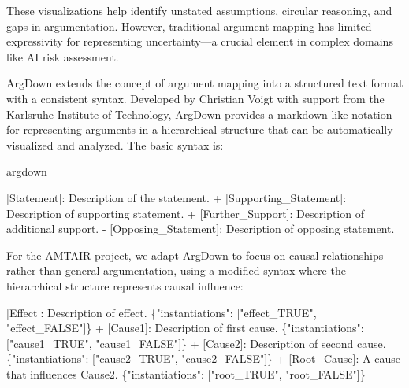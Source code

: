 \documentclass[
  11pt,
  letterpaper,
]{book}
\newenvironment{Shaded}{\begin{snugshade}}{\end{snugshade}}
\newcommand{\CommentTok}[1]{\textcolor[rgb]{0.37,0.37,0.37}{#1}}
\newcommand{\DataTypeTok}[1]{\textcolor[rgb]{0.68,0.00,0.00}{#1}}
\newcommand{\ErrorTok}[1]{\textcolor[rgb]{0.68,0.00,0.00}{#1}}
\newcommand{\FunctionTok}[1]{\textcolor[rgb]{0.28,0.35,0.67}{#1}}
\newcommand{\NormalTok}[1]{\textcolor[rgb]{0.00,0.23,0.31}{#1}}
\newcommand{\OtherTok}[1]{\textcolor[rgb]{0.00,0.23,0.31}{#1}}
\newcommand{\SpecialStringTok}[1]{\textcolor[rgb]{0.13,0.47,0.30}{#1}}
\newcommand{\StringTok}[1]{\textcolor[rgb]{0.13,0.47,0.30}{#1}}
\begin{document}
These visualizations help identify unstated assumptions, circular
reasoning, and gaps in argumentation. However, traditional argument
mapping has limited expressivity for representing uncertainty---a
crucial element in complex domains like AI risk assessment.

ArgDown extends the concept of argument mapping into a structured text
format with a consistent syntax. Developed by Christian Voigt with
support from the Karlsruhe Institute of Technology, ArgDown provides a
markdown-like notation for representing arguments in a hierarchical
structure that can be automatically visualized and analyzed. The basic
syntax is:

argdown

\begin{Shaded}
\begin{Highlighting}[]
\OtherTok{[Statement]: }\NormalTok{Description of the statement.}
\SpecialStringTok{ + }\CommentTok{[}\OtherTok{Supporting\_Statement}\CommentTok{]}\NormalTok{: Description of supporting statement.}
\SpecialStringTok{   + }\CommentTok{[}\OtherTok{Further\_Support}\CommentTok{]}\NormalTok{: Description of additional support.}
\SpecialStringTok{ {-} }\CommentTok{[}\OtherTok{Opposing\_Statement}\CommentTok{]}\NormalTok{: Description of opposing statement.}
\end{Highlighting}
\end{Shaded}

For the AMTAIR project, we adapt ArgDown to focus on causal
relationships rather than general argumentation, using a modified syntax
where the hierarchical structure represents causal influence:

\begin{Shaded}
\begin{Highlighting}[]
\OtherTok{[}\ErrorTok{Effect}\OtherTok{]}\ErrorTok{:} \ErrorTok{Description} \ErrorTok{of} \ErrorTok{effect.} \FunctionTok{\{}\DataTypeTok{"instantiations"}\FunctionTok{:} \OtherTok{[}\StringTok{"effect\_TRUE"}\OtherTok{,} \StringTok{"effect\_FALSE"}\OtherTok{]}\FunctionTok{\}}
 \ErrorTok{+} \OtherTok{[}\ErrorTok{Cause1}\OtherTok{]}\ErrorTok{:} \ErrorTok{Description} \ErrorTok{of} \ErrorTok{first} \ErrorTok{cause.} \FunctionTok{\{}\DataTypeTok{"instantiations"}\FunctionTok{:} \OtherTok{[}\StringTok{"cause1\_TRUE"}\OtherTok{,} \StringTok{"cause1\_FALSE"}\OtherTok{]}\FunctionTok{\}}
 \ErrorTok{+} \OtherTok{[}\ErrorTok{Cause2}\OtherTok{]}\ErrorTok{:} \ErrorTok{Description} \ErrorTok{of} \ErrorTok{second} \ErrorTok{cause.} \FunctionTok{\{}\DataTypeTok{"instantiations"}\FunctionTok{:} \OtherTok{[}\StringTok{"cause2\_TRUE"}\OtherTok{,} \StringTok{"cause2\_FALSE"}\OtherTok{]}\FunctionTok{\}}
   \ErrorTok{+} \OtherTok{[}\ErrorTok{Root\_Cause}\OtherTok{]}\ErrorTok{:} \ErrorTok{A} \ErrorTok{cause} \ErrorTok{that} \ErrorTok{influences} \ErrorTok{Cause2.} \FunctionTok{\{}\DataTypeTok{"instantiations"}\FunctionTok{:} \OtherTok{[}\StringTok{"root\_TRUE"}\OtherTok{,} \StringTok{"root\_FALSE"}\OtherTok{]}\FunctionTok{\}}
\end{Highlighting}
\end{Shaded}
\end{document}
